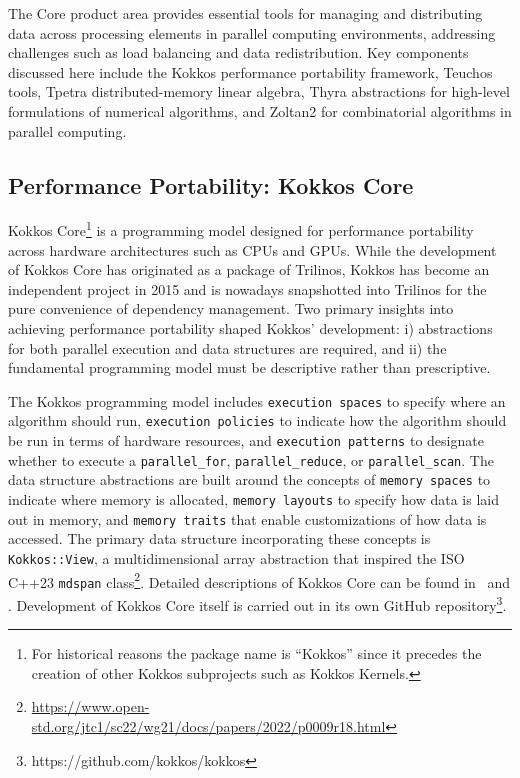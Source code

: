 
The Core product area provides essential tools for managing and distributing data across processing elements in parallel computing environments, addressing challenges such as load balancing and data redistribution. Key components discussed here include the Kokkos performance portability framework, Teuchos tools, Tpetra distributed-memory linear algebra, Thyra abstractions for high-level formulations of numerical algorithms, and Zoltan2 for combinatorial algorithms in parallel computing.

\subsection{Performance Portability: Kokkos Core}\label{subsec:kokkos}
Kokkos Core\footnote{For historical reasons the package name is ``Kokkos'' since it precedes the creation of other Kokkos subprojects such as Kokkos Kernels.} is a programming model designed for performance portability across hardware architectures such as CPUs and GPUs.
While the development of Kokkos Core has originated as a package of Trilinos, Kokkos has become an independent project in 2015
and is nowadays snapshotted into Trilinos for the pure convenience of dependency management.
Two primary insights into achieving performance portability shaped Kokkos' development:
i) abstractions for both parallel execution and data structures are required, and
ii) the fundamental programming model must be descriptive rather than prescriptive.

The Kokkos programming model includes \texttt{execution spaces} to specify where an algorithm should run, \texttt{execution policies} to indicate how the algorithm should be run in terms of hardware resources, and \texttt{execution patterns} to designate whether to execute a \mbox{\texttt{parallel\_for}}, \mbox{\texttt{parallel\_reduce}}, or \mbox{\texttt{parallel\_scan}}. The data structure abstractions are built around the concepts of \texttt{memory spaces} to indicate where memory is allocated, \texttt{memory layouts} to specify how data is laid out in memory, and \texttt{memory traits} that enable customizations of how data is accessed. The primary data structure incorporating
these concepts is \texttt{Kokkos::View}, a multidimensional array abstraction that inspired
the ISO C++23 \texttt{mdspan} class\footnote{\url{https://www.open-std.org/jtc1/sc22/wg21/docs/papers/2022/p0009r18.html}}. Detailed descriptions of Kokkos Core can be found
in~\cite{edwards2014} and \cite{trott2022kokkos}.
Development of Kokkos Core itself is carried out in its own GitHub repository\footnote{https://github.com/kokkos/kokkos}.

